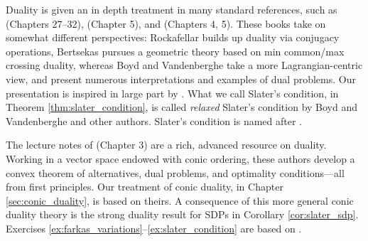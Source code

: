 Duality is given an in depth treatment in many standard references, such as
\cite{rockafellar1970convex} (Chapters 27--32), \cite{boyd2004convex} (Chapter  
5), and \cite{bertsekas2009convex} (Chapters 4, 5). These books take on
somewhat different perspectives: Rockafellar builds up duality via conjugacy
operations, Bertsekas pursues a geometric theory based on min common/max
crossing duality, whereas Boyd and Vandenberghe take a more Lagrangian-centric 
view, and present numerous interpretations and examples of dual problems. Our
presentation is inspired in large part by \cite{boyd2004convex}. What we call
Slater's condition, in Theorem \ref{thm:slater_condition}, is called
\emph{relaxed} Slater's condition by Boyd and Vandenberghe and other
authors. Slater's condition is named after \cite{slater1950lagrange}.  

The lecture notes of \cite{bental2023convex} (Chapter 3) are a rich, advanced
resource on duality. Working in a vector space endowed with conic ordering,
these authors develop a convex theorem of alternatives, dual problems, and
optimality conditions---all from first principles. Our treatment of conic 
duality, in Chapter \ref{sec:conic_duality}, is based on theirs. A consequence
of this more general conic duality theory is the strong duality result for SDPs
in Corollary \ref{cor:slater_sdp}. Exercises
\ref{ex:farkas_variations}--\ref{ex:slater_condition} are based on 
\cite{bental2023convex}.          
 
\clearpage

